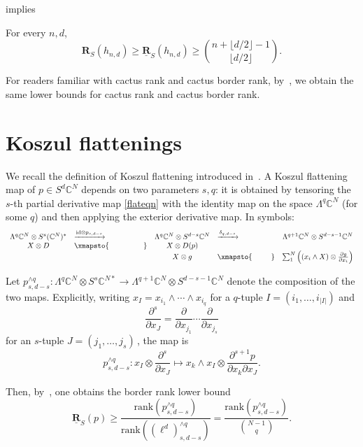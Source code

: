 \documentclass{toc}
\newcommand{\vvirg}{ , \dots , }
\newcommand{\textsum}{{\textstyle \sum}}
\newcommand{\textfrac}[2]{{\textstyle \frac{#1}{#2}}}
\newcommand{\bfR}{\mathbf{R}}
\newcommand{\bbC}{\mathbb{C}}
\newcommand{\id}{\mathrm{id}}
\newcommand{\uline}[1]{\underline{#1}}
\def\BC{\mathbb C}
\def\ww{\wedge}
\def\trank{\mathrm{rank}}
\newcommand{\xto}[1]{\xrightarrow{#1}}
\begin{document}
 implies
\begin{corollary}
For every $n,d$,  
 \[
\bfR_S(h_{n,d}) \geq  \uline{\bfR}_S(h_{n,d}) \geq \binom{n+\lfloor d/2 \rfloor -1}{\lfloor d/2 \rfloor}.
 \]
\end{corollary}
For readers familiar with cactus rank and cactus border rank, by~\cite[Thm. 5.3D]{MR1735271}, we obtain the same lower bounds for cactus rank and cactus border rank. 
 
\section{Koszul flattenings}
We recall the definition of Koszul flattening introduced in~\cite{MR3081636}. A Koszul flattening map of $p \in S^d \bbC^N$ depends on two parameters $s,q$: it is obtained by tensoring the $s$-th partial derivative map \eqref{flateqn} with the identity map on the space $\Lambda^q \BC^N$ (for some $q$) and then applying the exterior derivative map. In symbols: %
\begin{align*}
\begin{array}{clclc}
 \Lambda^q \bbC^N \otimes S^{s} (\bbC^N)^* &\xto{\id \otimes p_{s,d-s}} &\Lambda^q \bbC^N \otimes S^{d-s} \bbC^N & \xto{\delta_{q,d-s}}&\Lambda^{q+1} \bbC^N \otimes S^{d-s-1} \bbC^N \\
 X \otimes D &\xmapsto{\phantom{\id \otimes p_{s,d-s}}} & X \otimes D(p) & &  \\
 & &  X \otimes g & \xmapsto{\phantom{\delta_{q,d-s}}} &\textsum_1^N \left((x_i \wedge X) \otimes \textfrac{\partial g}{\partial x_i}\right)
\end{array}
 \end{align*}

 Let $p_{s,d-s}^{\ww q}:\Lambda^q \BC^N \otimes S^s\BC^{N*} \to \Lambda^{q+1}\BC^N\otimes S^{d-s-1}\BC^N$ denote the composition of the two maps. Explicitly, writing $x_I=x_{i_1}\ww \cdots \ww x_{i_{q}}$ for a $q$-tuple $I = (i_1 \vvirg i_{\vert I\vert})$ and
 \[
   \frac{\partial^{s}  }{\partial x_{J}}=\frac{\partial  }{\partial x_{j_1}}\cdots \frac{\partial  }{\partial x_{j_s}}
 \]
 for an $s$-tuple $J = (j_1 \vvirg j_s)$\,, the map is
\[
p_{s,d-s}^{\ww q}:  x_{I}\otimes \frac{\partial^{s}  }{\partial x_{J}}
\mapsto x_k\ww x_I\otimes \frac{\partial^{s+1} p }{\partial x_k \partial x_{J}}.
\]


Then, by~\cite[Prop 4.1.1]{MR3081636}, one obtains the border rank lower bound
\begin{equation}\label{eqn: Koszul flat bound for border rank}
\uline{\bfR}_S(p)\geq \frac{\trank(p_{s,d-s}^{\ww q})}{\trank((\ell^d)_{s,d-s}^{\ww q})}= \frac{\trank(p_{s,d-s}^{\ww q})}
{\binom{N-1}{q}}.
\end{equation}
\end{document}
